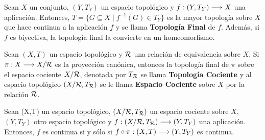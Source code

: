 \documentclass[cursovd_portada.tex]{subfiles}
\begin{document}
\begin{coro}
Sean $X$ un conjunto, $(Y,T_Y)$ un espacio topológico y $f:(Y,T_Y)\longrightarrow X$ una aplicación. Entonces, $T=\{G\subseteq
X\mid  f^{-1}(G)\in T_Y\}$ es la mayor topología sobre $X$ que hace continua a la aplicación $f$ y se llama {\bf
Topología Final} de $f$. Además, si $f$ es biyectiva, la topología final la convierte en un homeomorfismo.
\end{coro}
\begin{defi}
Sean $(X,T)$ un espacio topológico y ${\cal R}$ una relación de equivalencia sobre $X$. Si $\pi:X\longrightarrow X/{\cal R}$ es
la proyección canónica, entonces la topología final de $\pi$ sobre el espacio cociente $X/{\cal R}$, denotada por
$T_{{\cal R}}$ se llama {\bf Topología Cociente} y al espacio topológico $(X/{\cal R},T_{{\cal R}})$ se le llama {\bf
Espacio Cociente} sobre $X$ por la relación ${\cal R}$.
\end{defi}
\begin{prop}
Sean (X,T) un espacio topológico, $(X/{\cal R},T_{{\cal R}})$ un espacio cociente sobre $X$, $(Y,T_Y)$ otro espacio
topológico y $f:(X/{\cal R},T_{{\cal R}})\longrightarrow (Y,T_Y)$ una aplicación. Entonces, $f$ es continua si y sólo si
$f\circ\pi:(X,T)\longrightarrow (Y,T_Y)$ es continua.
\end{prop}
\end{document}
